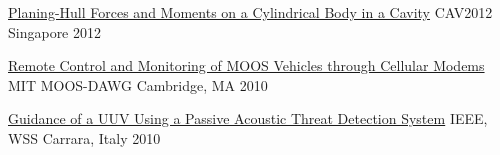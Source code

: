 
\begin{cvhonors}

  \cvhonor
    {\href{http://cav2012.sg/proceedings/pdf/285.pdf}
        {Planing-Hull Forces and Moments on a Cylindrical Body in a Cavity}}
    {CAV2012}
    {Singapore} %
    {2012} %

  \cvhonor
    {\href{http://oceanai.mit.edu/moos-dawg10/pmwiki/pmwiki.php?n=Talk.23-Sammut}
        {Remote Control and Monitoring of MOOS Vehicles through Cellular Modems}}
    {MIT MOOS-DAWG} %
    {Cambridge, MA} %
    {2010} %

  \cvhonor
    {\href{https://ieeexplore.ieee.org/document/5730239}
        {Guidance of a UUV Using a Passive Acoustic Threat Detection System}}
    {IEEE, WSS} %
    {Carrara, Italy} %
    {2010} %


\end{cvhonors}
